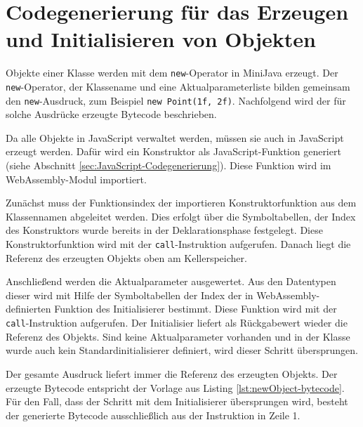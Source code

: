 





\section{Codegenerierung für das Erzeugen und Initialisieren von Objekten}
Objekte einer Klasse werden mit dem \lstinline{new}-Operator in MiniJava erzeugt. Der \lstinline{new}-Operator, der Klassename und eine Aktualparameterliste bilden gemeinsam den \lstinline{new}-Ausdruck, zum Beispiel \lstinline{new Point(1f, 2f)}. Nachfolgend wird der für solche Ausdrücke erzeugte Bytecode beschrieben.

Da alle Objekte in JavaScript verwaltet werden, müssen sie auch in JavaScript erzeugt werden. Dafür wird ein Konstruktor als JavaScript-Funktion generiert (siehe Abschnitt \ref{sec:JavaScript-Codegenerierung}). Diese Funktion wird im WebAssembly-Modul importiert.

Zunächst muss der Funktionsindex der importieren Konstruktorfunktion aus dem Klassennamen abgeleitet werden. Dies erfolgt über die Symboltabellen, der Index des Konstruktors wurde bereits in der Deklarationsphase festgelegt. Diese Konstruktorfunktion wird mit der \lstinline{call}-Instruktion aufgerufen. Danach liegt die Referenz des erzeugten Objekts oben am Kellerspeicher.

Anschließend werden die Aktualparameter ausgewertet. Aus den Datentypen dieser wird mit Hilfe der Symboltabellen der Index der in WebAssembly-definierten Funktion des Initialisierer bestimmt. Diese Funktion wird mit der \lstinline{call}-Instruktion aufgerufen. Der Initialisier liefert als Rückgabewert wieder die Referenz des Objekts. Sind keine Aktualparameter vorhanden und in der Klasse wurde auch kein Standardinitialisierer definiert, wird dieser Schritt übersprungen.

Der gesamte Ausdruck liefert immer die Referenz des erzeugten Objekts. Der erzeugte Bytecode entspricht der Vorlage aus Listing \ref{lst:newObject-bytecode}. Für den Fall, dass der Schritt mit dem Initialisierer übersprungen wird, besteht der generierte Bytecode ausschließlich aus der Instruktion in Zeile 1.


